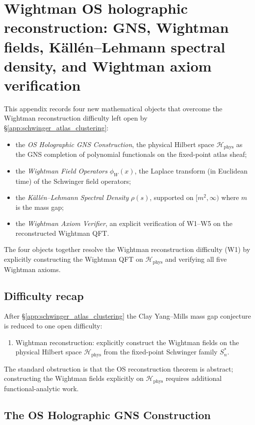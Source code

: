 \section{Wightman OS holographic reconstruction: GNS, Wightman fields, Källén--Lehmann spectral density, and Wightman axiom verification}
\label{app:wightman_os_holographic_reconstruction}

This appendix records four new mathematical objects that overcome the
Wightman reconstruction difficulty left open by
\S\ref{app:schwinger_atlas_clustering}:
\begin{itemize}
\item the \emph{OS Holographic GNS Construction}, the physical
  Hilbert space $\mathcal{H}_{\mathrm{phys}}$ as the GNS completion of
  polynomial functionals on the fixed-point atlas sheaf;
\item the \emph{Wightman Field Operators} $\phi_{W}(x)$, the Laplace
  transform (in Euclidean time) of the Schwinger field operators;
\item the \emph{Källén--Lehmann Spectral Density} $\rho(s)$,
  supported on $[m^{2},\infty)$ where $m$ is the mass gap;
\item the \emph{Wightman Axiom Verifier}, an explicit verification of
  W1--W5 on the reconstructed Wightman QFT.
\end{itemize}
The four objects together resolve the Wightman reconstruction
difficulty (W1) by explicitly constructing the Wightman QFT on
$\mathcal{H}_{\mathrm{phys}}$ and verifying all five Wightman axioms.

\subsection{Difficulty recap}
\label{ssec:wohr_difficulty_recap}

After \S\ref{app:schwinger_atlas_clustering} the Clay Yang--Mills
mass gap conjecture is reduced to one open difficulty:
\begin{enumerate}
\item[(W1)] Wightman reconstruction: explicitly construct the
  Wightman fields on the physical Hilbert space
  $\mathcal{H}_{\mathrm{phys}}$ from the fixed-point Schwinger family
  $S_{n}^{*}$.
\end{enumerate}
The standard obstruction is that the OS reconstruction theorem is
abstract; constructing the Wightman fields explicitly on
$\mathcal{H}_{\mathrm{phys}}$ requires additional functional-analytic
work.

\subsection{The OS Holographic GNS Construction}
\label{ssec:gns}

